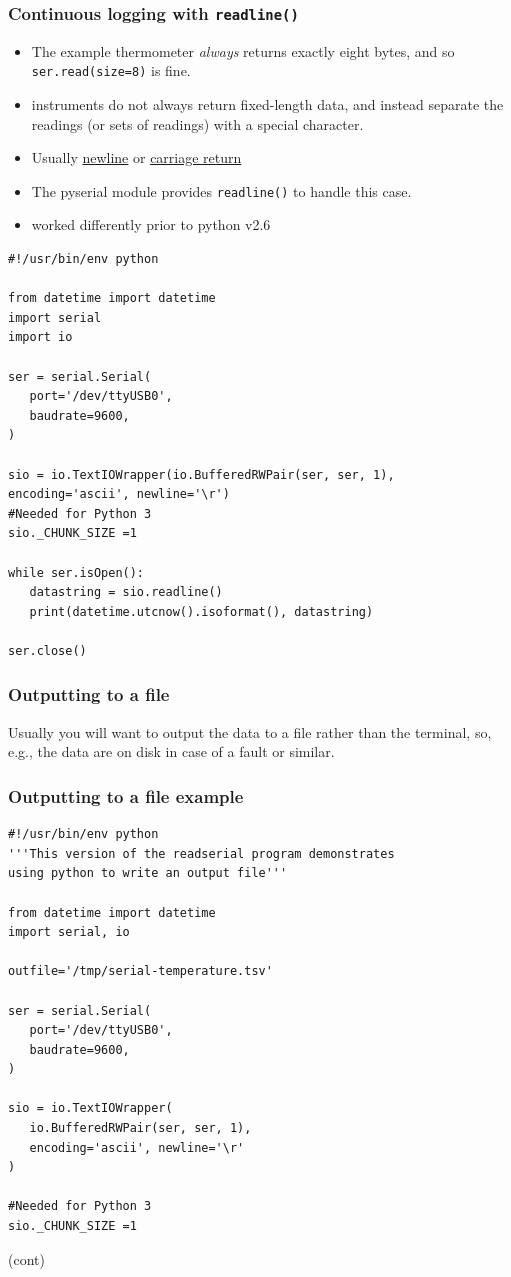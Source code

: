 \documentclass[aspectratio=1610,9pt]{beamer} %
\begin{document}
\begin{frame}[fragile]
\frametitle{Continuous logging with \texttt{readline()}}

\begin{itemize}
\itemsep1pt\parskip0pt
\item
  The example thermometer \emph{always} returns exactly eight bytes, and
  so \texttt{ser.read(size=8)} is fine.
\item
  instruments do not always return fixed-length data, and instead
  separate the readings (or sets of readings) with a special character.
\item
  Usually \href{http://en.wikipedia.org/wiki/Newline}{newline} or
  \href{http://en.wikipedia.org/wiki/Carriage_return}{carriage return}
\item
  The pyserial module provides \texttt{readline()} to handle this case.
\item
  worked differently prior to python v2.6
\end{itemize}
\end{frame}
\begin{frame}[fragile]

\begin{verbatim}
#!/usr/bin/env python

from datetime import datetime
import serial
import io

ser = serial.Serial(
   port='/dev/ttyUSB0',
   baudrate=9600,
)

sio = io.TextIOWrapper(io.BufferedRWPair(ser, ser, 1), encoding='ascii', newline='\r')
#Needed for Python 3
sio._CHUNK_SIZE =1

while ser.isOpen():
   datastring = sio.readline()
   print(datetime.utcnow().isoformat(), datastring)

ser.close()
\end{verbatim}

\end{frame}
\begin{frame}
\frametitle{Outputting to a file}

Usually you will want to output the data to a file rather than the
terminal, so, e.g., the data are on disk in case of a fault or similar.

\end{frame}
\begin{frame}[fragile]
\frametitle{Outputting to a file
example}

\begin{verbatim}
#!/usr/bin/env python
'''This version of the readserial program demonstrates
using python to write an output file'''

from datetime import datetime
import serial, io

outfile='/tmp/serial-temperature.tsv'

ser = serial.Serial(
   port='/dev/ttyUSB0',
   baudrate=9600,
)

sio = io.TextIOWrapper(
   io.BufferedRWPair(ser, ser, 1),
   encoding='ascii', newline='\r'
)

#Needed for Python 3
sio._CHUNK_SIZE =1

\end{verbatim}
(cont)
\end{frame}
\end{document}
